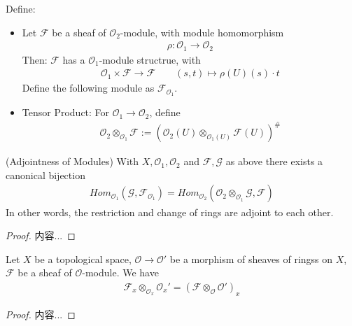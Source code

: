 \documentclass[Total.tex]{subfiles}
\begin{document}
					\begin{Def}
						Define:
						\begin{itemize}
							\item Let $\mathcal{F}$ be a sheaf of $\mathcal{O}_2$-module, with module homomorphism
							\begin{gather*}
								\rho:\mathcal{O}_1\rightarrow \mathcal{O}_2
							\end{gather*}
							Then: $\mathcal{F}$ has a $\mathcal{O}_1$-module structrue, with
							\begin{gather*}
								\mathcal{O}_1\times \mathcal{F}\rightarrow \mathcal{F}\qquad (s,t)\mapsto \rho(U)(s)\cdot t
							\end{gather*}
							Define the following module as $\mathcal{F}_{\mathcal{O}_1}$.
							\item Tensor Product: For $\mathcal{O}_1\rightarrow \mathcal{O}_2$, define
							\begin{gather*}
								\mathcal{O}_2\otimes_{\mathcal{O}_1} \mathcal{F}:=(\mathcal{O}_2(U)\otimes_{\mathcal{O}_1(U)} \mathcal{F}(U))^\#
							\end{gather*}
						\end{itemize}
					\end{Def}
					
					
					\begin{lemma}
						(Adjointness of Modules) With $X,\mathcal{O}_1,\mathcal{O}_2$ and $\mathcal{F},\mathcal{G}$ as above there exists a canonical bijection
						\begin{gather*}
							Hom_{\mathcal{O}_1}(\mathcal{G},\mathcal{F}_{\mathcal{O}_1})=Hom_{\mathcal{O}_2}(\mathcal{O}_2\otimes_{\mathcal{O}_1} \mathcal{G},\mathcal{F})
						\end{gather*}
						In other words, the restriction and change of rings are adjoint to each other.
					\end{lemma}
					\begin{proof}
						内容...
					\end{proof}
					\begin{corollary}
						Let $X$ be a topological space, $\mathcal{O}\rightarrow \mathcal{O}'$ be a morphism of sheaves of ringss on $X$, $\mathcal{F}$ be a sheaf of $\mathcal{O}$-module. We have
						\begin{gather*}
							\mathcal{F}_x\otimes_{\mathcal{O}_x} \mathcal{O}_x'=(\mathcal{F}\otimes_\mathcal{O} \mathcal{O}')_x
						\end{gather*}
					\end{corollary}
					\begin{proof}
						内容...
					\end{proof}
\end{document}
